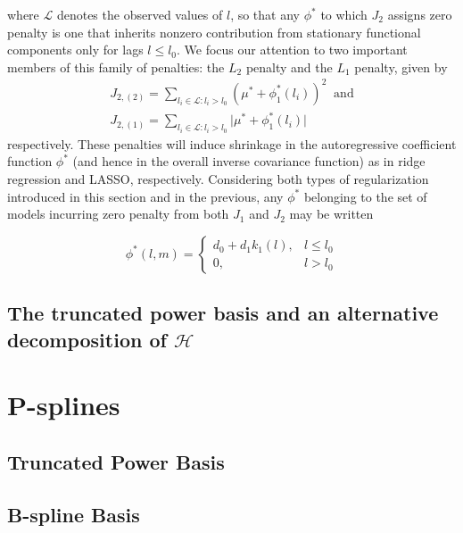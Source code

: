 \documentclass[12pt]{article}
\theoremstyle{definition}
\begin{document}
where $\mathcal{L}$ denotes the observed values of $l$, so that any $\phi^*$ to which $J_2$ assigns zero penalty is one that inherits nonzero contribution from stationary functional components only for lags $l \le l_0$. We focus our attention to two important members of this family of penalties: the $L_2$ penalty and the $L_1$ penalty, given by
\begin{eqnarray} \nonumber
 J_{2,\left(2\right)} = \sum_{ l_i \in \mathcal{L}: l_i > l_0} \left( \mu^* + \phi^*_1\left(l_i\right) \right)^2 \label{L2penalty} \;\;\mbox{and}\\
 J_{2,\left(1\right)} = \sum_{ l_i \in \mathcal{L}: l_i > l_0} \vert \mu^* + \phi^*_1\left(l_i\right) \vert \label{L1penalty}
 \end{eqnarray}\noindent
respectively. These penalties will induce shrinkage in the autoregressive coefficient function $\phi^*$ (and hence in the overall inverse covariance function) as in ridge regression and LASSO, respectively. Considering both types of regularization introduced in this section and in the previous, any $\phi^*$ belonging to the set of models incurring zero penalty from both $J_1$ and $J_2$ may be written

\[
\phi^*\left(l,m\right) = \left\{ \begin{array}{lr} d_0 + d_1 k_1\left(l\right), & l \le l_0 \\ 0, & l > l_0 \end{array} \right.
\]


\subsection{The truncated power basis and an alternative decomposition of $\mathcal{H}$}


\section{P-splines}

\subsection{Truncated Power Basis}

\subsection{B-spline Basis}
\end{document}
